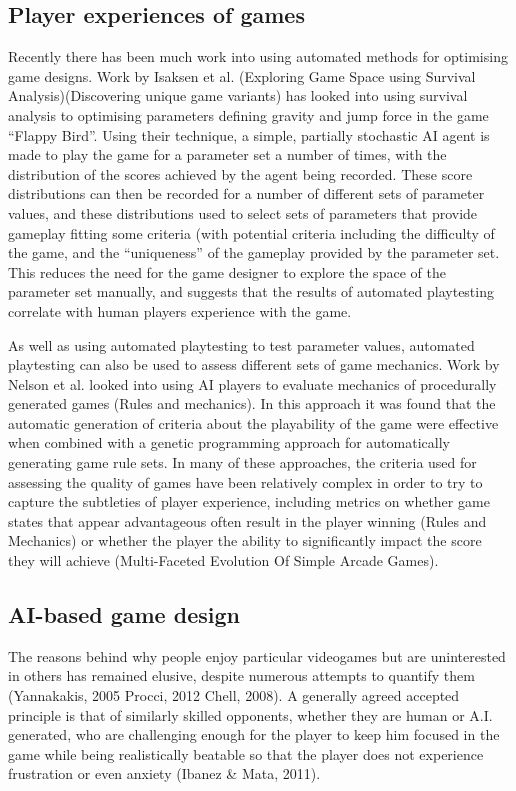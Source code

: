 \subsection{Player experiences of games}

Recently there has been much work into using automated methods for optimising game designs. Work by Isaksen et al. (Exploring Game Space using Survival Analysis)(Discovering unique game variants) has looked into using survival analysis to optimising parameters defining gravity and jump force in the game “Flappy Bird”. Using their technique, a simple, partially stochastic AI agent is made to play the game for a parameter set a number of times, with the distribution of the scores achieved by the agent being recorded. These score distributions can then be recorded for a number of different sets of parameter values, and these distributions used to select sets of parameters that provide gameplay fitting some criteria (with potential criteria including the difficulty of the game, and the “uniqueness” of the gameplay provided by the parameter set. This reduces the need for the game designer to explore the space of the parameter set manually, and suggests that the results of automated playtesting correlate with human players experience with the game.

As well as using automated playtesting to test parameter values, automated playtesting can also be used to assess different sets of game mechanics. Work by Nelson et al. looked into using AI players to evaluate mechanics of procedurally generated games (Rules and mechanics). In this approach it was found that the automatic generation of criteria about the playability of the game were effective when combined with a genetic programming approach for automatically generating game rule sets. In many of these approaches, the criteria used for assessing the quality of games have been relatively complex in order to try to capture the subtleties of player experience, including metrics on whether game states that appear advantageous often result in the player winning (Rules and Mechanics) or whether the player the ability to significantly impact the score they will achieve (Multi-Faceted Evolution Of Simple Arcade Games).

\subsection{AI-based game design}

The reasons behind why people enjoy particular videogames but are uninterested in others has remained elusive, despite numerous attempts to quantify them (Yannakakis, 2005 Procci, 2012 Chell, 2008). A generally agreed accepted principle is that of similarly skilled opponents, whether they are human or A.I. generated, who are challenging enough for the player to keep him focused in the game while being realistically beatable so that the player does not experience frustration or even anxiety (Ibanez \& Mata, 2011).

